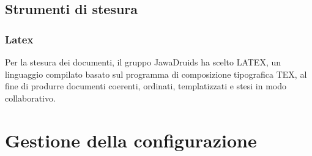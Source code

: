 \subsection{Strumenti di stesura}
\subsubsection{Latex}
Per la stesura dei documenti, il gruppo JawaDruids ha scelto LATEX, un linguaggio compilato basato sul programma di composizione tipografica TEX, al fine di produrre documenti coerenti, ordinati, templatizzati e stesi in modo collaborativo. 
\section{Gestione della configurazione}
